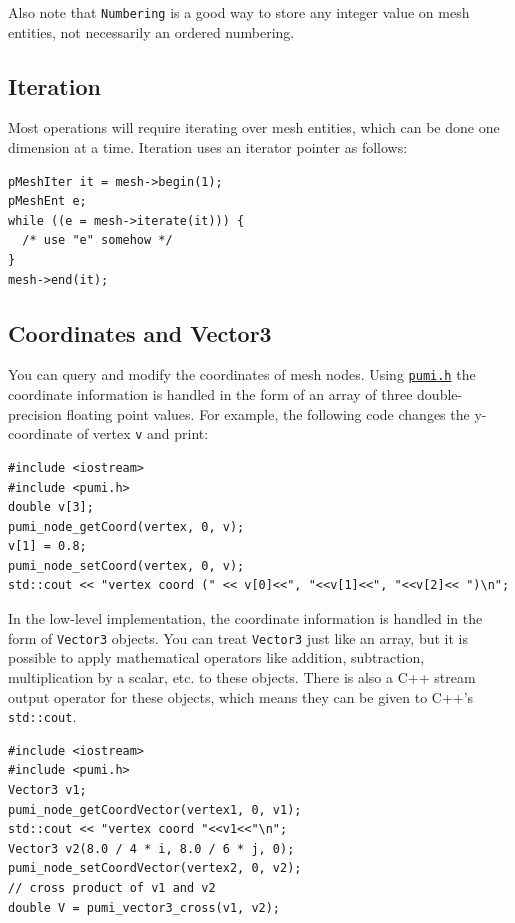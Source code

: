 \documentclass{article}
\begin{document}
Also note that \texttt{Numbering} is a good way to store
any integer value on mesh entities, not necessarily an
ordered numbering.

\subsection{Iteration}

Most operations will require iterating over mesh entities,
which can be done one dimension at a time.
Iteration uses an iterator pointer as follows:

\begin{lstlisting}
pMeshIter it = mesh->begin(1);
pMeshEnt e;
while ((e = mesh->iterate(it))) {
  /* use "e" somehow */
}
mesh->end(it);
\end{lstlisting}

\subsection{Coordinates and Vector3}

You can query and modify the coordinates of mesh nodes.
Using \href{https://github.com/SCOREC/core/blob/master/pumi/pumi.h}
{\texttt{pumi.h}} the coordinate information is handled in the form of
an array of three double-precision floating point values.
For example, the following code changes the y-coordinate of vertex {\texttt{v}} and print:

\begin{lstlisting}
#include <iostream>
#include <pumi.h>
double v[3];
pumi_node_getCoord(vertex, 0, v);
v[1] = 0.8;
pumi_node_setCoord(vertex, 0, v);
std::cout << "vertex coord (" << v[0]<<", "<<v[1]<<", "<<v[2]<< ")\n";
\end{lstlisting}

In the low-level implementation, the coordinate information is handled in the form of \texttt{Vector3} 
objects.
You can treat \texttt{Vector3} just like an array, but it is
possible to apply mathematical operators like addition, subtraction,
multiplication by a scalar, etc. to these objects.
There is also a C++ stream output operator for these objects, which
means they can be given to C++'s \texttt{std::cout}.

\begin{lstlisting}
#include <iostream>
#include <pumi.h>
Vector3 v1;
pumi_node_getCoordVector(vertex1, 0, v1);
std::cout << "vertex coord "<<v1<<"\n";
Vector3 v2(8.0 / 4 * i, 8.0 / 6 * j, 0);
pumi_node_setCoordVector(vertex2, 0, v2);
// cross product of v1 and v2
double V = pumi_vector3_cross(v1, v2);
\end{lstlisting}
\end{document}
